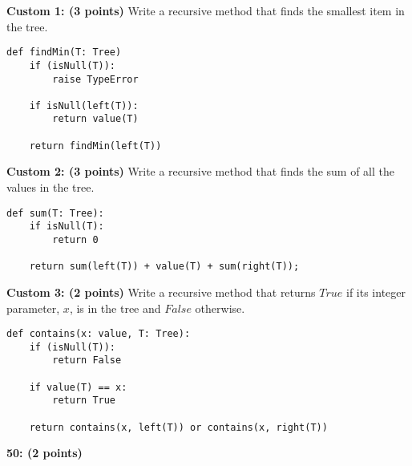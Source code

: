 \documentclass[12pt]{article}  %
\begin{document}
\noindent
{\bf Custom 1: (3 points)}
Write a recursive method that finds the smallest item in the tree.
\begin{verbatim}
def findMin(T: Tree)
    if (isNull(T)):
        raise TypeError
    
    if isNull(left(T)):
        return value(T)
    
    return findMin(left(T))
\end{verbatim}

\noindent
{\bf Custom 2: (3 points)}
Write a recursive method that finds the sum of all the values in the tree.
\begin{verbatim}
def sum(T: Tree):
    if isNull(T):
        return 0
    
    return sum(left(T)) + value(T) + sum(right(T));
\end{verbatim}

\clearpage
\noindent
{\bf Custom 3: (2 points)}
Write a recursive method that returns $True$ if its integer parameter, $x$, is in the tree and $False$ otherwise.
\begin{verbatim}
def contains(x: value, T: Tree):
    if (isNull(T)):
        return False
    
    if value(T) == x:
        return True
    
    return contains(x, left(T)) or contains(x, right(T))
\end{verbatim}

\clearpage
\noindent
{\bf 50: (2 points)}
\end{document}
